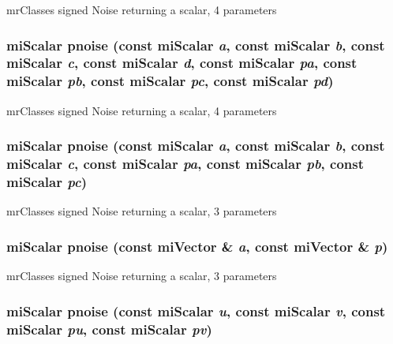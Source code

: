 mr\-Classes signed Noise returning a scalar, 4 parameters 

\subsubsection{\setlength{\rightskip}{0pt plus 5cm}mi\-Scalar pnoise (const mi\-Scalar {\em a}, const mi\-Scalar {\em b}, const mi\-Scalar {\em c}, const mi\-Scalar {\em d}, const mi\-Scalar {\em pa}, const mi\-Scalar {\em pb}, const mi\-Scalar {\em pc}, const mi\-Scalar {\em pd})\hspace{0.3cm}{\tt  [inline]}}\label{namespacersl_a103}


mr\-Classes signed Noise returning a scalar, 4 parameters 

\subsubsection{\setlength{\rightskip}{0pt plus 5cm}mi\-Scalar pnoise (const mi\-Scalar {\em a}, const mi\-Scalar {\em b}, const mi\-Scalar {\em c}, const mi\-Scalar {\em pa}, const mi\-Scalar {\em pb}, const mi\-Scalar {\em pc})\hspace{0.3cm}{\tt  [inline]}}\label{namespacersl_a102}


mr\-Classes signed Noise returning a scalar, 3 parameters 

\subsubsection{\setlength{\rightskip}{0pt plus 5cm}mi\-Scalar pnoise (const mi\-Vector \& {\em a}, const mi\-Vector \& {\em p})\hspace{0.3cm}{\tt  [inline]}}\label{namespacersl_a101}


mr\-Classes signed Noise returning a scalar, 3 parameters 

\subsubsection{\setlength{\rightskip}{0pt plus 5cm}mi\-Scalar pnoise (const mi\-Scalar {\em u}, const mi\-Scalar {\em v}, const mi\-Scalar {\em pu}, const mi\-Scalar {\em pv})\hspace{0.3cm}{\tt  [inline]}}\label{namespacersl_a100}


